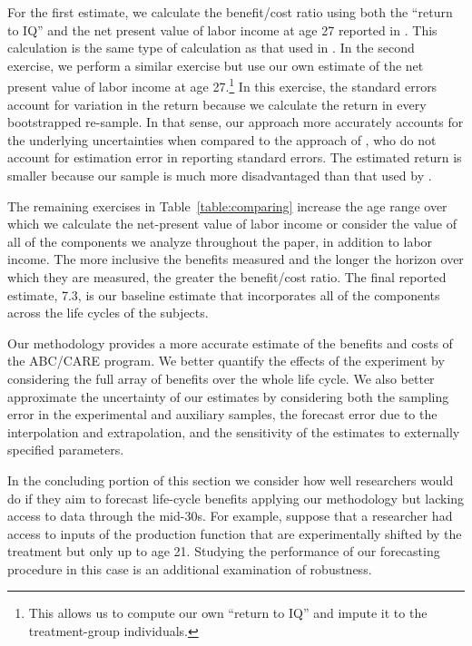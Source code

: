 For the first estimate, we calculate the benefit/cost ratio using both the ``return to IQ'' and the net present value of labor income at age 27 reported in \citet{Chetty_Friedman_etal_2011_QJoE}. This calculation is the same type of calculation as that used in \citet{Kline_Walters_2016_QJE}. In the second exercise, we perform a similar exercise but use our own estimate of the net present value of labor income at age 27.\footnote{This allows us to compute our own ``return to IQ'' and impute it to the treatment-group individuals.} In this exercise, the standard errors account for variation in the return because we calculate the return in every bootstrapped re-sample. In that sense, our approach more accurately accounts for the underlying uncertainties when compared to the approach of \citet{Kline_Walters_2016_QJE}, who do not account for estimation error in reporting standard errors. The estimated return is smaller because our sample is much more disadvantaged than that used by \citet{Chetty_Friedman_etal_2011_QJoE}.

The remaining exercises in Table~\ref{table:comparing} increase the age range over which we calculate the net-present value of labor income or consider the value of all of the components we analyze throughout the paper, in addition to labor income. The more inclusive the benefits measured and the longer the horizon over which they are measured, the greater the benefit/cost ratio. The final reported estimate, 7.3, is our baseline estimate that incorporates all of the components across the life cycles of the subjects.

Our methodology provides a more accurate estimate of the benefits and costs of the ABC/CARE program. We better quantify the effects of the experiment by considering the full array of benefits over the whole life cycle. We also better approximate the uncertainty of our estimates by considering both the sampling error in the experimental and auxiliary samples, the forecast error due to the interpolation and extrapolation, and the sensitivity of the estimates to externally specified parameters.

In the concluding portion of this section we consider how well researchers would do if they aim to forecast life-cycle benefits applying our methodology but lacking access to data through the mid-30s. For example, suppose that a researcher had access to inputs of the production function that are experimentally shifted by the treatment but only up to age 21. Studying the performance of our forecasting procedure in this case is an additional examination of robustness. 

